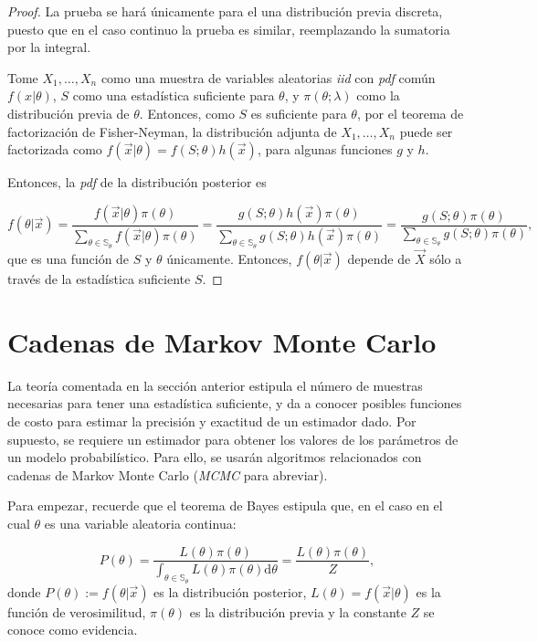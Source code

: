 		\begin{proof}
		La prueba se hará únicamente para el una distribución previa discreta, puesto que en el caso continuo la prueba es similar, reemplazando la sumatoria por la integral.
		
		Tome $X_1,\dots,X_n$ como una muestra de variables aleatorias \textit{iid} con \textit{pdf} común $f(x|\theta)$, $S$ como una estadística suficiente para $\theta$, y $\pi(\theta;\lambda)$ como la distribución previa de $\theta$. Entonces, como $S$ es suficiente para $\theta$, por el teorema de factorización de Fisher-Neyman, la distribución adjunta de $X_1,\dots,X_n$ puede ser factorizada como $f(\vec{x}|\theta)=f(S;\theta)h(\vec{x})$, para algunas funciones $g$ y $h$.
		
		Entonces, la \textit{pdf} de la distribución posterior es
		
		$$f(\theta|\vec{x})=\frac{f(\vec{x}|\theta)\pi(\theta)}{\sum_{\theta\in\mathbb{S}_\theta}f(\vec{x}|\theta)\pi(\theta)}=\frac{g(S;\theta)h(\vec{x})\pi(\theta)}{\sum_{\theta\in\mathbb{S}_\theta} g(S;\theta)h(\vec{x})\pi(\theta)}=\frac{g(S;\theta)\pi(\theta)}{\sum_{\theta\in\mathbb{S}_\theta} g(S;\theta)\pi(\theta)},$$
		que es una función de $S$ y $\theta$ únicamente. Entonces, $f(\theta|\vec{x})$ depende de $\vec{X}$ sólo a través de la estadística suficiente $S$.
		\end{proof}
		
		\section{Cadenas de Markov Monte Carlo}
		La teoría comentada en la sección anterior estipula el número de muestras necesarias para tener una estadística suficiente, y da a conocer posibles funciones de costo para estimar la precisión y exactitud de un estimador dado. Por supuesto, se requiere un estimador para obtener los valores de los parámetros de un modelo probabilístico. Para ello, se usarán algoritmos relacionados con cadenas de Markov Monte Carlo (\textit{MCMC} para abreviar).
		
		Para empezar, recuerde que el teorema de Bayes estipula que, en el caso en el cual $\theta$ es una variable aleatoria continua:
		
		\begin{equation}
			P(\theta)=\frac{L(\theta)\pi(\theta)}{\int_{\theta\in\mathbb{S}_\theta}L(\theta)\pi(\theta)\mathrm{d}\theta}=\frac{L(\theta)\pi(\theta)}{Z},
		\end{equation}
		donde $P(\theta):=f(\theta|\vec{x})$ es la distribución posterior, $L(\theta)=f(\vec{x}|\theta)$ es la función de verosimilitud, $\pi(\theta)$ es la distribución previa y la constante $Z$ se conoce como evidencia.
		
